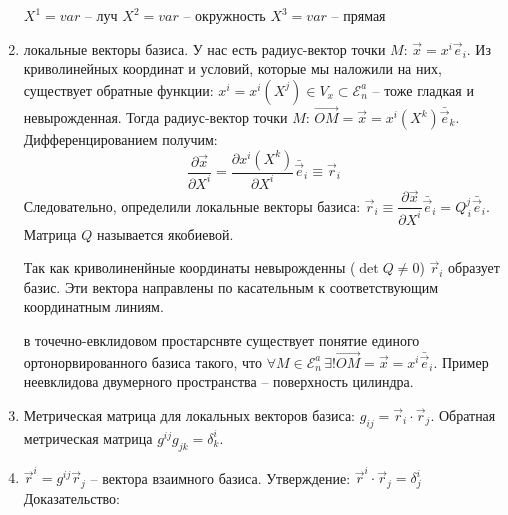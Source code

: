 \begin{enumerate}
    $X^1 = var$ -- луч
    $X^2 = var$ -- окружность
    $X^3 = var$ -- прямая

  \item локальные векторы базиса. У нас есть радиус-вектор точки $M$: $\vec{x} = x^i \vec{e}_i$. 
    Из криволинейных координат и условий, которые мы наложили на них, существует обратные функции:
    $x^i = x^i(X^j) \in V_x \subset \mathcal{E}_n^a$ -- тоже гладкая и невырожденная. Тогда 
    радиус-вектор точки $M$: $\vec{OM} = \vec{x} = x^i(X^k) \bar{\vec{e}}_k$. Дифференцированием
    получим:
    \[
      \dfrac{\partial \vec{x}}{\partial X^i} = \dfrac{\partial x^i (X^k)}{\partial X^i} \bar{\vec{e}}_i
      \equiv \vec{r}_i
    \]
    Следовательно, определили локальные векторы базиса: 
    $\vec{r}_i \equiv \dfrac{\partial \vec{x}}{\partial X^i} \bar{\vec{e}}_i
    = Q^j_{\, i} \bar{\vec{e}}_i$. Матрица $Q$ называется якобиевой.

    Так как криволиненйные координаты невырожденны ($\det Q \neq 0$) $\vec{r}_i$ образует 
    базис. Эти вектора направлены по касательным к соответствующим координатным линиям.

    в точечно-евклидовом простарснвте существует понятие единого ортонорвированного базиса такого,
    что $\forall M \in \mathcal{E}_n^a \, \exists! \vec{OM} = \vec{x} = x^i \bar{\vec{e}}_i$.
    Пример неевклидова двумерного пространства -- поверхность цилиндра.

  \item Метрическая матрица для локальных векторов базиса: $g_{ij} = \vec{r}_i \cdot \vec{r}_j$. 
    Обратная метрическая матрица $g^{ij} g_{jk} = \delta^i_k$.

  \item $\vec{r}^i = g^{ij} \vec{r}_j$ -- вектора взаимного базиса.
    Утверждение: $\vec{r}^i \cdot \vec{r}_j = \delta^i_j$
    Доказательство: 
\end{enumerate}

